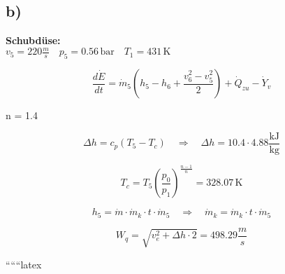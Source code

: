 

\subsection*{b)}

\textbf{Schubdüse:} \\
\( v_5 = 220 \frac{m}{s} \quad p_5 = 0.56 \, \text{bar} \quad T_1 = 431 \, \text{K} \)

\[
\frac{d \dot{E}}{d t} = \dot{m}_5 \left( h_5 - h_6 + \frac{v_6^2 - v_5^2}{2} \right) + \dot{Q}_{zu} - \dot{Y}_{v}
\]

 n = 1.4

\[
\Delta h = c_p (T_5 - T_c) \quad \Rightarrow \quad \Delta h = 10.4 \cdot 4.88 \frac{\text{kJ}}{\text{kg}}
\]

\[
T_c = T_5 \left( \frac{p_0}{p_1} \right)^{\frac{n-1}{n}} = 328.07 \, \text{K}
\]

\[
h_5 = \dot{m} \cdot \dot{m}_k \cdot t \cdot \dot{m}_5 \quad \Rightarrow \quad \dot{m}_k = \dot{m}_k \cdot t \cdot \dot{m}_5
\]

\[
W_q = \sqrt{v_e^2 + \Delta h \cdot 2} = 498.29 \frac{m}{s}
\]

``````latex